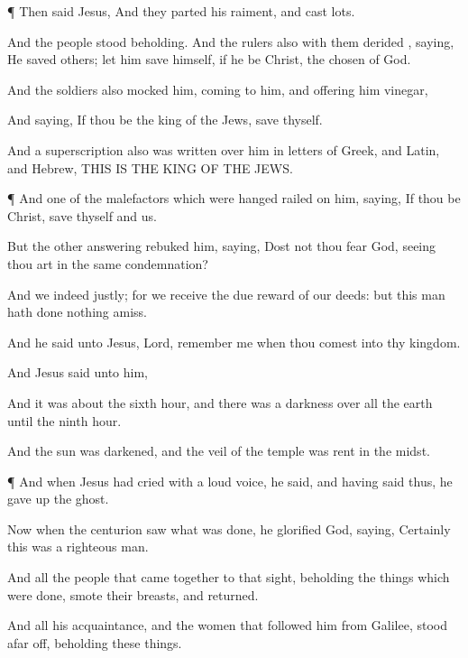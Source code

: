{\par }{\PP {}¶
Then
said
Jesus,
{}
And they
parted
his
raiment, and
cast
lots.

And the
people
stood
beholding.
And the
rulers
also
with
them
derided
{},
saying, He
saved
others; let him
save
himself,
if
he
be
Christ, the
chosen of
God.

And the
soldiers
also
mocked
him, coming
to
him,
and offering
him
vinegar,

And
saying,
If
thou
be the
king of the
Jews,
save
thyself.

And a
superscription
also
was
written
over
him in
letters of
Greek,
and
Latin,
and
Hebrew,
THIS
IS THE
KING OF THE
JEWS.


\par }{\PP {}¶
And
one of the
malefactors
which were
hanged
railed on
him,
saying,
If
thou
be
Christ,
save
thyself
and
us.

But the
other
answering
rebuked
him,
saying,
Dost
not
thou
fear
God,
seeing thou
art
in the
same
condemnation?

And
we
indeed
justly;
for we
receive the due
reward of our
deeds:
but this
man hath
done
nothing
amiss.

And he
said unto
Jesus,
Lord,
remember
me
when thou
comest
into
thy
kingdom.

And
Jesus
said unto
him,
{}

And it
was
about the
sixth
hour,
and there
was a
darkness
over
all the
earth
until the
ninth
hour.

And the
sun was
darkened,
and the
veil of the
temple was
rent in the
midst.


\par }{\PP {}¶
And when
Jesus had
cried with a
loud
voice, he
said,
{}
and having
said
thus, he gave up the
ghost.

Now when the
centurion
saw
what was
done, he
glorified
God,
saying,
Certainly
this
was a
righteous
man.

And
all the
people
that came
together
to
that
sight,
beholding the things
which were
done,
smote
their
breasts, and
returned.

And
all
his
acquaintance,
and the
women
that
followed
him
from
Galilee,
stood afar
off,
beholding these
things.


}

